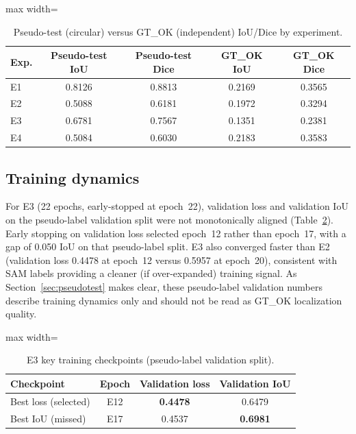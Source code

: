 \documentclass[final,5p,times,twocolumn,authoryear]{elsarticle}
\begin{document}
\begin{table}[!htbp]
\centering
\caption{Pseudo-test (circular) versus GT\_OK (independent) IoU/Dice by experiment.}
\label{tab:pseudotest}
\begin{adjustbox}{max width=\columnwidth}
\begin{tabular}{lcccc}
\toprule
\textbf{Exp.} & \textbf{Pseudo-test IoU} & \textbf{Pseudo-test Dice} & \textbf{GT\_OK IoU} & \textbf{GT\_OK Dice} \\
\midrule
E1 & 0.8126 & 0.8813 & 0.2169 & 0.3565 \\
E2 & 0.5088 & 0.6181 & 0.1972 & 0.3294 \\
E3 & 0.6781 & 0.7567 & 0.1351 & 0.2381 \\
E4 & 0.5084 & 0.6030 & 0.2183 & 0.3583 \\
\bottomrule
\end{tabular}
\end{adjustbox}
\end{table}

\subsection{Training dynamics}

For E3 (22 epochs, early-stopped at epoch~22), validation loss and validation IoU on the pseudo-label validation split were not monotonically aligned (Table~\ref{tab:v3_dynamics}). Early stopping on validation loss selected epoch~12 rather than epoch~17, with a gap of 0.050 IoU on that pseudo-label split. E3 also converged faster than E2 (validation loss 0.4478 at epoch~12 versus 0.5957 at epoch~20), consistent with SAM labels providing a cleaner (if over-expanded) training signal. As Section~\ref{sec:pseudotest} makes clear, these pseudo-label validation numbers describe training dynamics only and should not be read as GT\_OK localization quality.

\begin{table}[!htbp]
\centering
\caption{E3 key training checkpoints (pseudo-label validation split).}
\label{tab:v3_dynamics}
\begin{adjustbox}{max width=\columnwidth}
\begin{tabular}{lccc}
\toprule
\textbf{Checkpoint} & \textbf{Epoch} & \textbf{Validation loss} & \textbf{Validation IoU} \\
\midrule
Best loss (selected) & E12 & \textbf{0.4478} & 0.6479 \\
Best IoU (missed)    & E17 & 0.4537           & \textbf{0.6981} \\
\bottomrule
\end{tabular}
\end{adjustbox}
\end{table}
\end{document}
